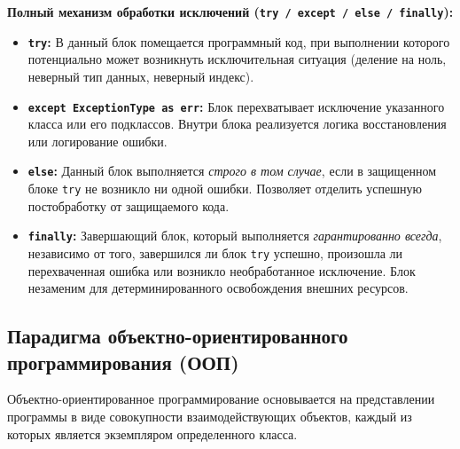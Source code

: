 \documentclass[14pt,a4paper]{extarticle}
\begin{document}
\textbf{Полный механизм обработки исключений (\texttt{try / except / else / finally}):}
\begin{itemize}
    \item \textbf{\texttt{try}:} В данный блок помещается программный код, при выполнении которого потенциально может возникнуть исключительная ситуация (деление на ноль, неверный тип данных, неверный индекс).
    \item \textbf{\texttt{except ExceptionType as err}:} Блок перехватывает исключение указанного класса или его подклассов. Внутри блока реализуется логика восстановления или логирование ошибки.
    \item \textbf{\texttt{else}:} Данный блок выполняется \textit{строго в том случае}, если в защищенном блоке \texttt{try} не возникло ни одной ошибки. Позволяет отделить успешную постобработку от защищаемого кода.
    \item \textbf{\texttt{finally}:} Завершающий блок, который выполняется \textit{гарантированно всегда}, независимо от того, завершился ли блок \texttt{try} успешно, произошла ли перехваченная ошибка или возникло необработанное исключение. Блок незаменим для детерминированного освобождения внешних ресурсов.
\end{itemize}

\subsection{Парадигма объектно-ориентированного программирования (ООП)}

Объектно-ориентированное программирование основывается на представлении программы в виде совокупности взаимодействующих объектов, каждый из которых является экземпляром определенного класса.
\end{document}
